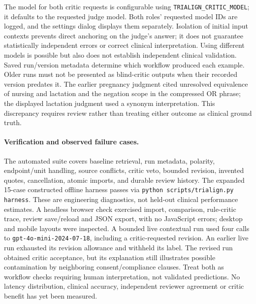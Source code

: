 \documentclass[10pt,letterpaper]{article}
\newcommand{\pathcode}[1]{\nolinkurl{#1}}
\begin{document}
The model for both critic requests is configurable using
\pathcode{TRIALIGN_CRITIC_MODEL}; it defaults to the requested judge model.
Both roles' requested model IDs are logged, and the settings dialog displays
them separately. Isolation of initial input contexts prevents direct anchoring
on the judge's answer; it does not guarantee statistically independent errors
or correct clinical interpretation. Using different models is possible but
also does not establish independent clinical validation. Saved run/version
metadata determine which workflow produced each example. Older runs must not
be presented as blind-critic outputs when their recorded version predates it.
The earlier pregnancy judgment cited unresolved equivalence of nursing and
lactation and the negation scope in the compressed OR phrase; the displayed
lactation judgment used a synonym interpretation. This discrepancy requires
review rather than treating either outcome as clinical ground truth.

\paragraph{Verification and observed failure cases.}
The automated suite covers baseline retrieval, run metadata,
polarity, endpoint/unit handling, source conflicts,
critic veto, bounded revision, invented quotes, cancellation, atomic imports,
and durable review history. The expanded 15-case constructed offline harness
passes via \pathcode{python scripts/trialign.py harness}. These are engineering
diagnostics, not held-out clinical performance estimates.
A headless browser check exercised import, comparison, rule-critic trace,
review save/reload and JSON export, with no JavaScript errors; desktop and
mobile layouts were inspected. A bounded live contextual run used four calls
to \pathcode{gpt-4o-mini-2024-07-18}, including a critic-requested revision.
An earlier live run exhausted its revision allowance and withheld its label.
The revised run obtained critic acceptance, but its explanation still illustrates
possible contamination by neighboring consent/compliance clauses. Treat both
as workflow checks requiring human interpretation, not validated predictions.
No latency distribution, clinical accuracy, independent reviewer agreement or
critic benefit has yet been measured.
\end{document}
